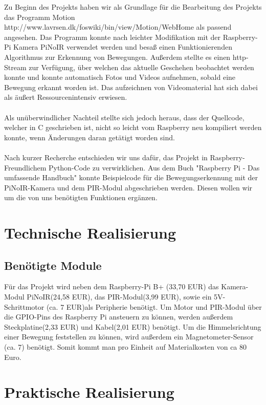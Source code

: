 \documentclass[12pt,a4paper]{scrreprt}
\begin{document}
Zu Beginn des Projekts haben wir als Grundlage für die Bearbeitung des Projekts das Programm Motion http://www.lavrsen.dk/foswiki/bin/view/Motion/WebHome als passend angesehen. Das Programm konnte nach leichter Modifikation mit der Raspberry-Pi Kamera PiNoIR verwendet werden und besaß einen Funktionierenden Algorithmus zur Erkennung von Bewegungen. Außerdem stellte es einen http-Stream zur Verfügung, über welchen das aktuelle Geschehen beobachtet werden konnte und konnte automatisch Fotos und Videos aufnehmen, sobald eine Bewegung erkannt worden ist. Das aufzeichnen von Videomaterial hat sich dabei als äußert Ressourcenintensiv erwiesen.
\\ \\
Als unüberwindlicher Nachteil stellte sich jedoch heraus, dass der Quellcode, welcher in C geschrieben ist, nicht so leicht vom Raspberry neu kompiliert werden konnte, wenn Änderungen daran getätigt worden sind.
\\ \\
Nach kurzer Recherche entschieden wir uns dafür, das Projekt in Raspberry-Freundlichem Python-Code zu verwirklichen.
Aus dem Buch "Raspberry Pi - Das umfassende Handbuch" konnte Beispielcode für die Bewegungserkennung mit der PiNoIR-Kamera und dem PIR-Modul abgeschrieben werden.
Diesen wollen wir um die von uns benötigten Funktionen ergänzen.

\chapter{Technische Realisierung}
\section{Benötigte Module}
Für das Projekt wird neben dem Raspberry-Pi B+ (33,70 EUR) das Kamera-Modul PiNoIR(24,58 EUR), das PIR-Modul(3,99 EUR), sowie ein 5V-Schrittmotor (ca. 7 EUR)als Peripherie benötigt. Um Motor und PIR-Modul über die GPIO-Pins des Raspberry Pi ansteuern zu können, werden außerdem Steckplatine(2,33 EUR) und Kabel(2,01 EUR) benötigt. Um die Himmelsrichtung einer Bewegung feststellen zu können, wird außerdem ein Magnetometer-Sensor (ca. 7) benötigt.
Somit kommt man pro Einheit auf Materialkosten von ca 80 Euro.


\chapter{Praktische Realisierung}
\end{document}
